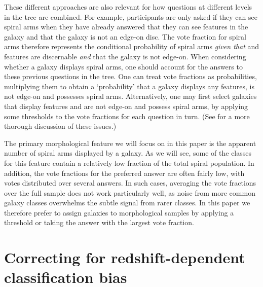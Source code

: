 \documentclass[useAMS,usenatbib]{mn2e}
\begin{document}
These different approaches are also relevant for how questions at different levels in the tree are combined.  For example, participants are only asked if they can see spiral arms when they have already answered that they can see features in the galaxy and that the galaxy is not an edge-on disc.  The vote fraction for spiral arms therefore represents the conditional probability of spiral arms \emph{given that} and features are discernable \emph{and} that the galaxy is not edge-on. When considering whether a galaxy displays spiral arms, one should account for the answers to these previous questions in the tree.  One can treat vote fractions as probabilities, multiplying them to obtain a `probability' that a galaxy displays any features, is not edge-on and possesses spiral arms.  Alternatively, one may first select galaxies that display features and are not edge-on and possess spiral arms, by applying some thresholds to the vote fractions for each question in turn. (See \citealt{Casteels_13} for a more thorough discussion of these issues.)

The primary morphological feature we will focus on in this paper is the apparent number of spiral arms displayed by a galaxy.
As we will see, some of the classes for this feature contain a relatively low fraction of the total spiral population.  In addition, the vote fractions for the preferred answer are often fairly low, with votes distributed over several answers.
In such cases, averaging the vote fractions over the full sample does not work particularly well, as noise from more common galaxy classes overwhelms the subtle signal from rarer classes.  In this paper we therefore prefer to assign galaxies to morphological samples by applying a threshold or taking the answer with the largest vote fraction.



\section{Correcting for redshift-dependent classification bias}
\label{sec:biases}
\end{document}
